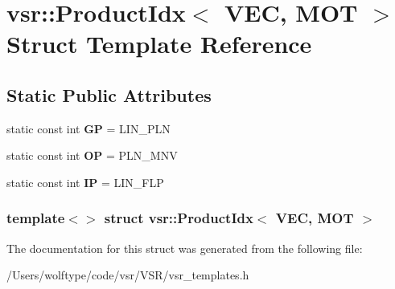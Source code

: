 \hypertarget{structvsr_1_1_product_idx_3_01_v_e_c_00_01_m_o_t_01_4}{\section{vsr\-:\-:Product\-Idx$<$ V\-E\-C, M\-O\-T $>$ Struct Template Reference}
\label{structvsr_1_1_product_idx_3_01_v_e_c_00_01_m_o_t_01_4}
}
\subsection*{Static Public Attributes}
\begin{DoxyCompactItemize}
\item 
\hypertarget{structvsr_1_1_product_idx_3_01_v_e_c_00_01_m_o_t_01_4_a91c931011d9b2cc2173f21d9fef2df15}{static const int {\bfseries G\-P} = L\-I\-N\-\_\-\-P\-L\-N}\label{structvsr_1_1_product_idx_3_01_v_e_c_00_01_m_o_t_01_4_a91c931011d9b2cc2173f21d9fef2df15}

\item 
\hypertarget{structvsr_1_1_product_idx_3_01_v_e_c_00_01_m_o_t_01_4_aa594d49681e0e723fa41dcca5e0fb295}{static const int {\bfseries O\-P} = P\-L\-N\-\_\-\-M\-N\-V}\label{structvsr_1_1_product_idx_3_01_v_e_c_00_01_m_o_t_01_4_aa594d49681e0e723fa41dcca5e0fb295}

\item 
\hypertarget{structvsr_1_1_product_idx_3_01_v_e_c_00_01_m_o_t_01_4_aa6958003197c33d7e1ceeb11957b722c}{static const int {\bfseries I\-P} = L\-I\-N\-\_\-\-F\-L\-P}\label{structvsr_1_1_product_idx_3_01_v_e_c_00_01_m_o_t_01_4_aa6958003197c33d7e1ceeb11957b722c}

\end{DoxyCompactItemize}
\subsubsection*{template$<$$>$ struct vsr\-::\-Product\-Idx$<$ V\-E\-C, M\-O\-T $>$}



The documentation for this struct was generated from the following file\-:\begin{DoxyCompactItemize}
\item 
/\-Users/wolftype/code/vsr/\-V\-S\-R/vsr\-\_\-templates.\-h\end{DoxyCompactItemize}

